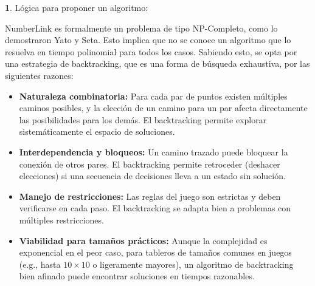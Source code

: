 \documentclass[spanish]{article}
\numberwithin{equation}{section}
\numberwithin{figure}{section}
\theoremstyle{definition}
\newtheorem*{defn*}{\protect\definitionname}
\providecommand{\definitionname}{Definition}
\begin{document}
\begin{defn*}
    Lógica para proponer un algoritmo:
\end{defn*}

NumberLink es formalmente un problema de tipo NP-Completo, como lo demostraron Yato y Seta. Esto implica que no se conoce un algoritmo que lo resuelva en tiempo polinomial para todos los casos. Sabiendo esto, se opta por una estrategia de backtracking, que es una forma de búsqueda exhaustiva, por las siguientes razones:

\begin{itemize}
    \item \textbf{Naturaleza combinatoria:} Para cada par de puntos existen múltiples caminos posibles, y la elección de un camino para un par afecta directamente las posibilidades para los demás. El backtracking permite explorar sistemáticamente el espacio de soluciones.
    \item \textbf{Interdependencia y bloqueos:} Un camino trazado puede bloquear la conexión de otros pares. El backtracking permite retroceder (deshacer elecciones) si una secuencia de decisiones lleva a un estado sin solución.
    \item \textbf{Manejo de restricciones:} Las reglas del juego son estrictas y deben verificarse en cada paso. El backtracking se adapta bien a problemas con múltiples restricciones.
    \item \textbf{Viabilidad para tamaños prácticos:} Aunque la complejidad es exponencial en el peor caso, para tableros de tamaños comunes en juegos (e.g., hasta $10 \times 10$ o ligeramente mayores), un algoritmo de backtracking bien afinado puede encontrar soluciones en tiempos razonables.
\end{itemize}
\end{document}
